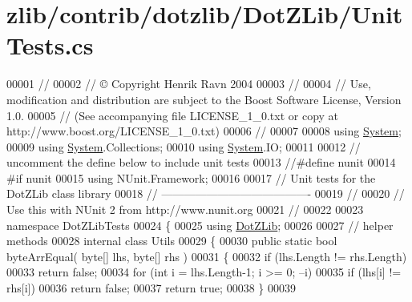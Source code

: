 \hypertarget{zlib_2contrib_2dotzlib_2_dot_z_lib_2_unit_tests_8cs_source}{}\section{zlib/contrib/dotzlib/\+Dot\+Z\+Lib/\+Unit\+Tests.cs}
\label{zlib_2contrib_2dotzlib_2_dot_z_lib_2_unit_tests_8cs_source}

\begin{DoxyCode}
00001 \textcolor{comment}{//}
00002 \textcolor{comment}{// © Copyright Henrik Ravn 2004}
00003 \textcolor{comment}{//}
00004 \textcolor{comment}{// Use, modification and distribution are subject to the Boost Software License, Version 1.0.}
00005 \textcolor{comment}{// (See accompanying file LICENSE\_1\_0.txt or copy at http://www.boost.org/LICENSE\_1\_0.txt)}
00006 \textcolor{comment}{//}
00007 
00008 \textcolor{keyword}{using} \hyperlink{namespace_system}{System};
00009 \textcolor{keyword}{using} \hyperlink{namespace_system}{System}.Collections;
00010 \textcolor{keyword}{using} \hyperlink{namespace_system}{System}.IO;
00011 
00012 \textcolor{comment}{// uncomment the define below to include unit tests}
00013 \textcolor{comment}{//#define nunit}
00014 \textcolor{preprocessor}{#if nunit}
00015 \textcolor{keyword}{using} NUnit.Framework;
00016 
00017 \textcolor{comment}{// Unit tests for the DotZLib class library}
00018 \textcolor{comment}{// ----------------------------------------}
00019 \textcolor{comment}{//}
00020 \textcolor{comment}{// Use this with NUnit 2 from http://www.nunit.org}
00021 \textcolor{comment}{//}
00022 
00023 \textcolor{keyword}{namespace }DotZLibTests
00024 \{
00025     \textcolor{keyword}{using} \hyperlink{namespace_dot_z_lib}{DotZLib};
00026 
00027     \textcolor{comment}{// helper methods}
00028     \textcolor{keyword}{internal} \textcolor{keyword}{class }Utils
00029     \{
00030         \textcolor{keyword}{public} \textcolor{keyword}{static} \textcolor{keywordtype}{bool} byteArrEqual( byte[] lhs, byte[] rhs )
00031         \{
00032             \textcolor{keywordflow}{if} (lhs.Length != rhs.Length)
00033                 \textcolor{keywordflow}{return} \textcolor{keyword}{false};
00034             \textcolor{keywordflow}{for} (\textcolor{keywordtype}{int} i = lhs.Length-1; i >= 0; --i)
00035                 \textcolor{keywordflow}{if} (lhs[i] != rhs[i])
00036                     \textcolor{keywordflow}{return} \textcolor{keyword}{false};
00037             \textcolor{keywordflow}{return} \textcolor{keyword}{true};
00038         \}
00039 

\end{DoxyCode}
